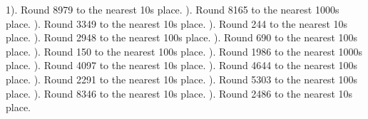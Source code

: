 \documentclass{article}%
\begin{document}
1). Round 8979 to the nearest 10s place.%
\newline%
\newline%
). Round 8165 to the nearest 1000s place.%
\newline%
\newline%
). Round 3349 to the nearest 10s place.%
\newline%
\newline%
). Round 244 to the nearest 10s place.%
\newline%
\newline%
). Round 2948 to the nearest 100s place.%
\newline%
\newline%
). Round 690 to the nearest 100s place.%
\newline%
\newline%
). Round 150 to the nearest 100s place.%
\newline%
\newline%
). Round 1986 to the nearest 1000s place.%
\newline%
\newline%
). Round 4097 to the nearest 10s place.%
\newline%
\newline%
). Round 4644 to the nearest 100s place.%
\newline%
\newline%
). Round 2291 to the nearest 10s place.%
\newline%
\newline%
). Round 5303 to the nearest 100s place.%
\newline%
\newline%
). Round 8346 to the nearest 10s place.%
\newline%
\newline%
). Round 2486 to the nearest 10s place.%
\newline%
\newline%
\end{document}
